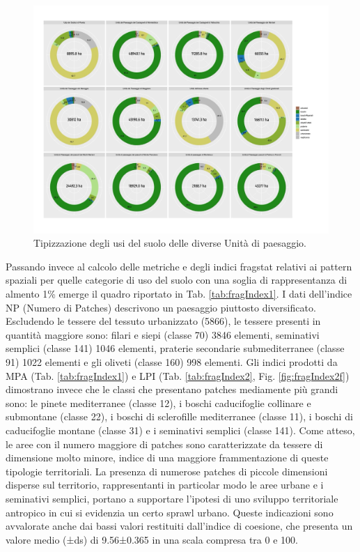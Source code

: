 \documentclass[
  a4paper,
]{book}
\begin{document}
\begin{figure}

{\centering \includegraphics[width=\linewidth]{./figs/RECSpoleto_unitaPaesaggioPlot} 

}

\caption{Tipizzazione degli usi del suolo delle diverse Unità di paesaggio.}\label{fig:unitaPaes}
\end{figure}

Passando invece al calcolo delle metriche e degli indici fragstat relativi ai pattern spaziali per quelle categorie di uso del suolo con una soglia di rappresentanza di almento 1\% emerge il quadro riportato in Tab.
\ref{tab:fragIndex1}.
I dati dell'indice NP (Numero di Patches) descrivono un paesaggio piuttosto diversificato.
Escludendo le tessere del tessuto urbanizzato (5866), le tessere presenti in quantità maggiore sono: filari e siepi (classe 70) 3846 elementi, seminativi semplici (classe 141) 1046 elementi, praterie secondarie submediterranee (classe 91) 1022 elementi e gli oliveti (classe 160) 998 elementi.
Gli indici prodotti da MPA (Tab. \ref{tab:fragIndex1}) e LPI (Tab. \ref{tab:fragIndex2}, Fig.
\ref{fig:fragIndex2f}) dimostrano invece che le classi che presentano patches mediamente più grandi sono: le pinete mediterranee (classe 12), i boschi caducifoglie collinare e submontane (classe 22), i boschi di sclerofille mediterranee (classe 11), i boschi di caducifoglie montane (classe 31) e i seminativi semplici (classe 141).
Come atteso, le aree con il numero maggiore di patches sono caratterizzate da tessere di dimensione molto minore, indice di una maggiore frammentazione di queste tipologie territoriali.
La presenza di numerose patches di piccole dimensioni disperse sul territorio, rappresentanti in particolar modo le aree urbane e i seminativi semplici, portano a supportare l'ipotesi di uno sviluppo territoriale antropico in cui si evidenzia un certo sprawl urbano.
Queste indicazioni sono avvalorate anche dai bassi valori restituiti dall'indice di coesione, che presenta un valore medio (±ds) di 9.56±0.365 in una scala compresa tra 0 e 100.
\end{document}
